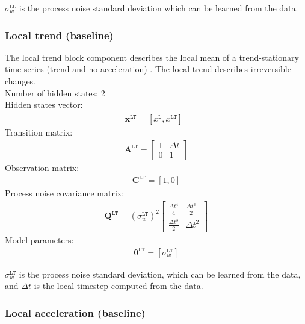 \noindent
$\sigma_{w}^{\mathtt{LL}}$ is the process noise standard deviation which can be learned from the data.

\subsubsection{Local trend (baseline)}

The local trend block component describes the local mean of a trend-stationary time series (trend and no acceleration) \cite{STC:STC2035}. 
The local trend describes irreversible changes.\\

\noindent
Number of hidden states: 2\\

Hidden states vector: 
\begin{gather*}
 \mathbf{x}^{\mathtt{LT}} = [x^{\mathtt{L}}, x^{\mathtt{LT}}]^{\intercal}
 \end{gather*}
Transition matrix: 
\begin{gather*}
\mathbf{A}^{\mathtt{LT}}= \left[\begin{array}{cc}1 &\Delta t\\0&1\end{array}\right]
\end{gather*}
Observation matrix: 
\begin{gather*}
\mathbf{C}^{\mathtt{LT}}=[1, 0]
\end{gather*}
Process noise covariance matrix: 
\begin{gather*}
\mathbf{Q}^{\mathtt{LT}}= (\sigma_{w}^{\mathtt{LT}})^{2}\left[\begin{array}{cc}\tfrac{\Delta t^{4}}{4} &\tfrac{\Delta t^{3}}{2}\\\tfrac{\Delta t^{3}}{2}&\Delta t^{2}\end{array}\right]
\end{gather*}
Model parameters: 
\begin{gather*}
\bm\theta^{\mathtt{LT}}=[\sigma_{w}^{\mathtt{LT}} ]
\end{gather*}

\noindent
$\sigma_{w}^{\mathtt{LT}}$ is the process noise standard deviation, which can be learned from the data, and $\Delta t$ is the local timestep computed from the data.


\subsubsection{Local acceleration (baseline)}

